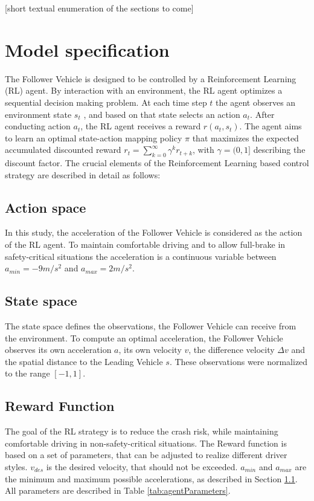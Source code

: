 \documentclass[review]{elsarticle}
\begin{document}
[short textual enumeration of the sections to come]

\section{Model specification}
The Follower Vehicle is designed to be controlled by a Reinforcement Learning (RL) agent. By interaction with an environment, the RL agent optimizes a sequential decision making problem. At each time step $t$ the agent observes an environment state $s_t$ , and based on that state selects an action $a_t$. After conducting action $a_t$, the RL agent receives a reward $r(a_t,s_t)$. The agent aims to learn an optimal state-action mapping policy $\pi$ that maximizes the expected accumulated discounted reward $r_{t}=\sum_{k=0}^{\infty} \gamma^{k} r_{t+k}$, with $\gamma = (0,1]$ describing the discount factor. The crucial elements
of the Reinforcement Learning based control strategy are described
in detail as follows:

\subsection{Action space}
\label{actionSpace}
In this study, the acceleration of the Follower Vehicle is considered as the action of the RL agent. To maintain  comfortable driving and to allow full-brake in safety-critical situations the acceleration is a continuous variable between $a_{min} = -9m/s^2$ and $a_{max} = 2m/s^2$.


\subsection{State space}
The state space defines the observations, the Follower Vehicle can receive from the environment. To compute an optimal acceleration, the Follower Vehicle observes its own acceleration $a$, its own velocity $v$, the difference velocity $\Delta v$ and the spatial distance to the Leading Vehicle $s$. These observations were normalized to the range $[-1,1]$.


\subsection{Reward Function}
The goal of the RL strategy is to reduce the crash risk, while maintaining comfortable driving in non-safety-critical situations. The Reward function is based on a set of parameters, that can be adjusted to realize different driver styles. $v_{des}$ is the desired velocity, that should not be exceeded. $a_{min}$ and $a_{max}$ are the minimum and maximum possible accelerations, as described in Section \ref{actionSpace}. All parameters are described in Table \ref{tab:agentParameters}.
\end{document}
